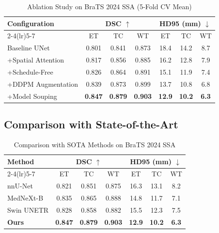 \documentclass[conference]{IEEEtran}
\begin{document}
\begin{table}[htbp]
\caption{Ablation Study on BraTS 2024 SSA (5-Fold CV Mean)}
\begin{center}
\setlength{\tabcolsep}{4pt}
\begin{tabular}{lcccccc}
\toprule
\multirow{2}{*}{\textbf{Configuration}} &
\multicolumn{3}{c}{\textbf{DSC} $\uparrow$} &
\multicolumn{3}{c}{\textbf{HD95 (mm)} $\downarrow$} \\
\cmidrule(lr){2-4}\cmidrule(lr){5-7}
& ET & TC & WT & ET & TC & WT \\
\midrule
Baseline UNet        & 0.801 & 0.841 & 0.873 & 18.4 & 14.2 & 8.7 \\
+Spatial Attention   & 0.817 & 0.856 & 0.885 & 16.2 & 12.8 & 7.9 \\
+Schedule-Free       & 0.826 & 0.864 & 0.891 & 15.1 & 11.9 & 7.4 \\
+DDPM Augmentation   & 0.839 & 0.873 & 0.899 & 13.7 & 10.8 & 6.8 \\
+Model Souping       & \textbf{0.847} & \textbf{0.879} &
                       \textbf{0.903} & \textbf{12.9} &
                       \textbf{10.2} & \textbf{6.3} \\
\bottomrule
\end{tabular}
\label{tab:ablation}
\end{center}
\end{table}

\subsection{Comparison with State-of-the-Art}

\begin{table}[htbp]
\caption{Comparison with SOTA Methods on BraTS 2024 SSA}
\begin{center}
\setlength{\tabcolsep}{4pt}
\begin{tabular}{lcccccc}
\toprule
\multirow{2}{*}{\textbf{Method}} &
\multicolumn{3}{c}{\textbf{DSC} $\uparrow$} &
\multicolumn{3}{c}{\textbf{HD95 (mm)} $\downarrow$} \\
\cmidrule(lr){2-4}\cmidrule(lr){5-7}
& ET & TC & WT & ET & TC & WT \\
\midrule
nnU-Net \cite{b2}     & 0.821 & 0.851 & 0.875 & 16.3 & 13.1 & 8.2 \\
MedNeXt-B \cite{b3}  & 0.835 & 0.865 & 0.888 & 14.8 & 11.7 & 7.1 \\
Swin UNETR \cite{b4} & 0.828 & 0.858 & 0.882 & 15.5 & 12.3 & 7.5 \\
\textbf{Ours}         & \textbf{0.847} & \textbf{0.879} &
                        \textbf{0.903} & \textbf{12.9} &
                        \textbf{10.2} & \textbf{6.3} \\
\bottomrule
\end{tabular}
\label{tab:sota}
\end{center}
\end{table}
\end{document}
